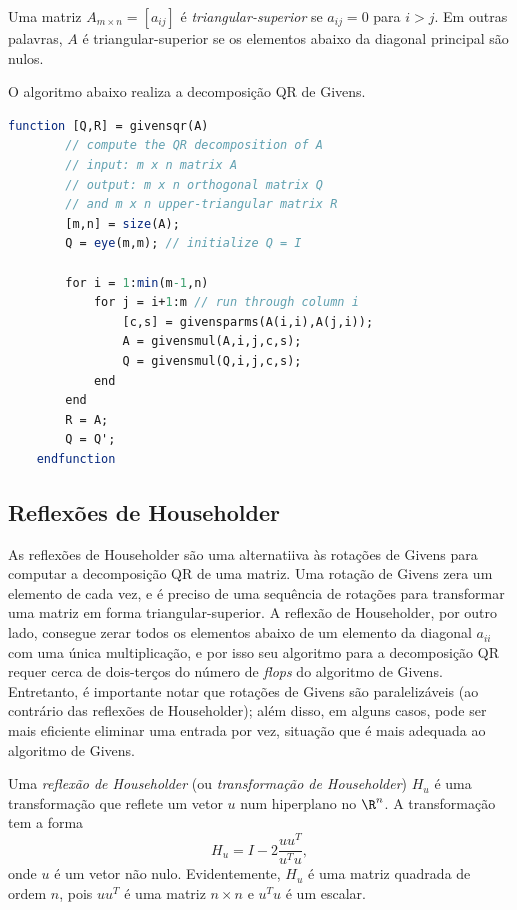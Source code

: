 \documentclass{article}
\begin{document}
\begin{defn}
    Uma matriz \(A_{m \times n} = [a_{ij}]\) é \emph{triangular-superior} se \(a_{ij} = 0\) para \(i > j\). Em outras palavras, \(A\) é triangular-superior se os elementos abaixo da diagonal principal são nulos.
\end{defn}

O algoritmo abaixo realiza a decomposição QR de Givens.

\begin{lstlisting}[language=Scilab, caption=Decomposição QR de Givens]
    function [Q,R] = givensqr(A)
        // compute the QR decomposition of A
        // input: m x n matrix A
        // output: m x n orthogonal matrix Q
        // and m x n upper-triangular matrix R
        [m,n] = size(A);
        Q = eye(m,m); // initialize Q = I
        
        for i = 1:min(m-1,n)
            for j = i+1:m // run through column i
                [c,s] = givensparms(A(i,i),A(j,i));
                A = givensmul(A,i,j,c,s);
                Q = givensmul(Q,i,j,c,s);
            end
        end
        R = A;
        Q = Q';
    endfunction
\end{lstlisting}

\subsection{Reflexões de Householder}

As reflexões de Householder são uma alternatiiva às rotações de Givens para computar a decomposição QR de uma matriz. Uma rotação de Givens zera um elemento de cada vez, e é preciso de uma sequência de rotações para transformar uma matriz em forma triangular-superior. A reflexão de Householder, por outro lado, consegue zerar todos os elementos abaixo de um elemento da diagonal \(a_{ii}\) com uma única multiplicação, e por isso seu algoritmo para a decomposição QR requer cerca de dois-terços do número de \emph{flops} do algoritmo de Givens. 
Entretanto, é importante notar que rotações de Givens são paralelizáveis (ao contrário das reflexões de Householder); além disso, em alguns casos, pode ser mais eficiente eliminar uma entrada por vez, situação que é mais adequada ao algoritmo de Givens.

\begin{defn}
    Uma \emph{reflexão de Householder} (ou \emph{transformação de Householder}) \(H_u\) é uma transformação que reflete um vetor \(u\) num hiperplano no \(\R^n\). A transformação tem a forma
\begin{equation}
    H_u = I - 2\frac{uu^T}{u^Tu},
\end{equation}
onde \(u\) é um vetor não nulo. Evidentemente, \(H_u\) é uma matriz quadrada de ordem \(n\), pois \(uu^T\) é uma matriz \(n \times n\) e \(u^Tu\) é um escalar.
\end{defn}
\end{document}
